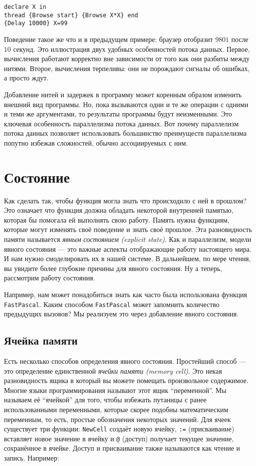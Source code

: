 \begin{lstlisting}
declare X in
thread {Browse start} {Browse X*X} end
{Delay 10000} X=99
\end{lstlisting}

Поведение такое же что и в предыдущем примере: браузер отобразит $9801$ после $10$ секунд. Это иллюстрация двух удобных особенностей потока данных. Первое, вычисления работают корректно вне зависимости от того как они разбиты между нитями. Второе, вычисления терпеливы: они не порождают сигналы об ошибках, а просто ждут.

Добавление нитей и задержек в программу может коренным образом изменить внешний вид программы. Но, пока вызываются одни и те же операции с одними и теми же аргументами, то результаты программы будут неизменными. Это ключевая особенность параллелизма потока данных. Вот почему параллелизм потока данных позволяет использовать большинство преимуществ параллелизма попутно избежав сложностей, обычно ассоциируемых с ним.

\section{Состояние}

Как сделать так, чтобы функция могла знать что происходило с ней в прошлом? Это означает что функция должна обладать некоторой внутренней памятью, которая бы помогала ей выполнять свою работу. Память нужна функциям, которые могут изменять своё поведение и знать своё прошлое. Эта разновидность памяти называется \emph{явным состоянием (explicit state)}. Как и параллелизм, модели явного состояния --- это важные аспекты отображающие работу настоящего мира. И нам нужно смоделировать их в нашей системе. В дальнейшем, по мере чтения, вы увидите более глубокие причины для явного состояния. Ну а теперь, рассмотрим работу состояния.

Например, нам может понадобиться знать как часто была использована функция \lstinline|FastPascal|. Каким способом \lstinline|FastPascal| может запомнить количество предыдущих вызовов? Мы реализуем это через добавление явного состояния.

\subsection{Ячейка памяти}

Есть несколько способов определения явного состояния. Простейший способ --- это определение единственной \emph{ячейки памяти (memory cell)}. Это некая разновидность ящика в который вы можете помещать произвольное содержимое. Многие языки программирования называют этот ящик ``переменной''. Мы называем её ``ячейкой'' для того, чтобы избежать путаницы с ранее использованными переменными, которые скорее подобны математическим переменным, то есть, простые обозначения некоторых значений. Для ячеек существует три функции: \lstinline|NewCell| создаёт новую ячейку, \lstinline|:=| (присваивание) вставляет новое значение в ячейку и \lstinline|@| (доступ) получает текущее значение, сохранённое в ячейке. Доступ и присваивание также называются как чтение и запись. Например:

